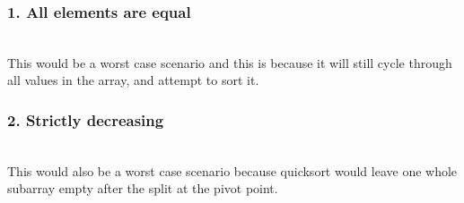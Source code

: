 \documentclass[12pt]{amsart}
\begin{document}
\subsubsection{1. All elements are equal}
\leavevmode \\
This would be a worst case scenario and this is because it will still cycle through all values in the array, and attempt to sort it.

\subsubsection{2. Strictly decreasing}
\leavevmode \\
This would also be a worst case scenario because quicksort would leave one whole subarray empty after the split at the pivot point.
\end{document}
